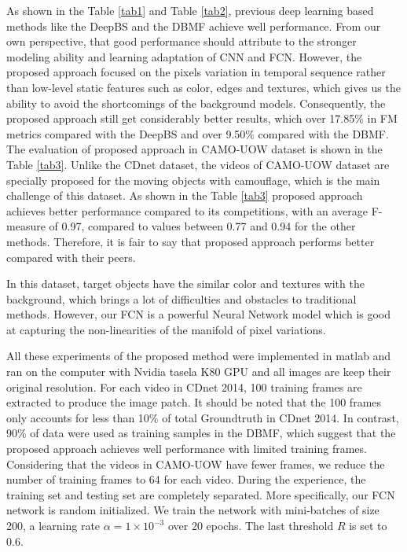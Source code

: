 \documentclass[journal]{IEEEtran}
\newcommand{\reftab}[1]{Table \ref{#1}}
\begin{document}
	As shown in the \reftab{tab1} and \reftab{tab2}, previous deep learning based methods like the DeepBS and the DBMF achieve well performance. 
From our own perspective, that good performance should attribute to the stronger modeling ability and learning adaptation of CNN and FCN. 
However, the proposed approach focused on the pixels variation in temporal sequence rather than low-level static features such as color, edges and textures, which gives us the ability to avoid the shortcomings of the background models. 
Consequently, the proposed approach still get considerably better results, which over 17.85\% in FM metrics compared with the DeepBS and over 9.50\% compared with the DBMF.
The evaluation of proposed approach in CAMO-UOW dataset is shown in the \reftab{tab3}. 
Unlike the CDnet dataset, the videos of CAMO-UOW dataset are specially proposed for the moving objects with camouflage, which is the main challenge of this dataset. 
As shown in the \reftab{tab3} proposed approach achieves better performance compared to its competitions, with an average F-measure of 0.97, compared to values between 0.77 and 0.94 for the other methods. 
Therefore, it is fair to say that proposed approach performs better compared with their peers. 


In this dataset, target objects have the similar color and textures with the background, which brings a lot of difficulties and obstacles to traditional methods. 
However, our FCN is a powerful Neural Network model which is good at capturing the non-linearities of the manifold of pixel variations. 


All these experiments of the proposed method were implemented in matlab and ran on the computer with Nvidia tasela K80 GPU and all images are keep their original resolution. 
For each video in CDnet 2014, 100 training frames are extracted to produce the image patch. 
It should be noted that the 100 frames only accounts for less than 10\% of total Groundtruth in CDnet 2014. 
In contrast, 90\% of data were used as training samples in the DBMF, which suggest that the proposed approach achieves well performance with limited training frames. 
Considering that the videos in CAMO-UOW have fewer frames, we reduce the number of training frames to 64 for each video. 
During the experience, the training set and testing set are completely separated. 
More specifically, our FCN network is random initialized. 
We train the network with mini-batches of size 200, a learning rate $\alpha  = 1 \times 10^{{−3}}$ over 20 epochs. 
The last threshold $R$ is set to 0.6.
\end{document}

